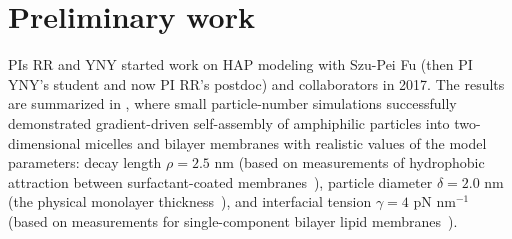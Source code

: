 \section{Preliminary work}
\label{sec:preliminary_work}
PIs RR and YNY started work on HAP modeling with Szu-Pei Fu (then PI YNY's student and now PI RR's postdoc) and collaborators in 2017. 
%
%
%
The results are summarized in \cite{Fu2018_SIAM}, where
small particle-number simulations successfully demonstrated gradient-driven self-assembly of
amphiphilic particles into two-dimensional micelles and bilayer membranes with realistic values of
the model parameters: decay length $\rho=2.5$ nm (based on measurements of
hydrophobic attraction between surfactant-coated
membranes~\cite{Eriksson1989, Lin2005, Parsegian, Israelachvili80}),
particle diameter $\delta = 2.0$ nm (the physical monolayer thickness~\cite{Boal}),
and interfacial tension $\gamma = 4$ pN nm$^{-1}$ (based on
measurements for single-component bilayer lipid
membranes~\cite{GarciaSaez, KUZMIN2005, Petelska2012, Jackson2016}).

